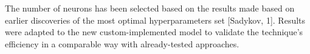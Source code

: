 {The number of neurons has been selected based on the results made based on earlier discoveries of the most optimal hyperparameters set [Sadykov, 1].
Results were adapted to the new custom-implemented model to validate the technique's efficiency in a comparable way with already-tested approaches.
\begin{table}[ht]
    \renewcommand{\arraystretch}{1.3}
    \caption{Model structure and parameters}
    \centering
    \label{tab:params}
\end{table}
}

